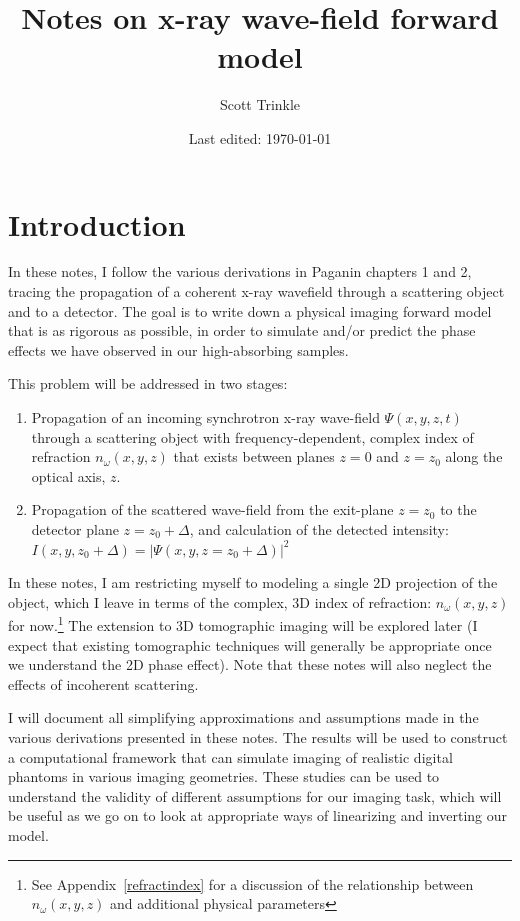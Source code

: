 \documentclass{article}
\title{Notes on x-ray wave-field forward model}
\author{Scott Trinkle}
\date{Last edited: \today}
\begin{document}
\maketitle

\section*{Introduction}
In these notes, I follow the various derivations in Paganin\cite{paganin}
chapters 1 and 2, tracing the propagation of a coherent x-ray wavefield through
a scattering object and to a detector. The goal is to write down a physical
imaging forward model that is as rigorous as possible, in order to simulate
and/or predict the phase effects we have observed in our high-absorbing samples.

This problem will be addressed in two stages:
\begin{enumerate}
\item Propagation of an incoming synchrotron x-ray wave-field $\Psi(x,y,z,t)$
  through a scattering object with frequency-dependent, complex index of
  refraction $n_{\omega}(x,y,z)$ that exists between planes $z=0$ and
  $z=z_0$ along the optical axis, $z$.
\item Propagation of the scattered wave-field from the exit-plane $z=z_0$ to the
  detector plane $z=z_0 + \Delta$, and calculation of the detected intensity:
  $I(x,y,z_0+\Delta) = |\Psi(x,y,z=z_0+\Delta)|^2$
\end{enumerate}

In these notes, I am restricting myself to modeling a single 2D projection of
the object, which I leave in terms of the complex, 3D index of refraction:
$n_{\omega}(x,y,z)$ for now.\footnote{See Appendix~\ref{refractindex} for a
  discussion of the relationship between $n_{\omega}(x,y,z)$ and additional
  physical parameters} The extension to 3D tomographic imaging will be explored
later (I expect that existing tomographic techniques will generally be
appropriate once we understand the 2D phase effect). Note that these notes will
also neglect the effects of incoherent scattering.

I will document all simplifying approximations and assumptions made in the
various derivations presented in these notes. The results will be used to
construct a computational framework that can simulate imaging of realistic
digital phantoms in various imaging geometries. These studies can be used to
understand the validity of different assumptions for our imaging task, which
will be useful as we go on to look at appropriate ways of linearizing and
inverting our model.
\end{document}

